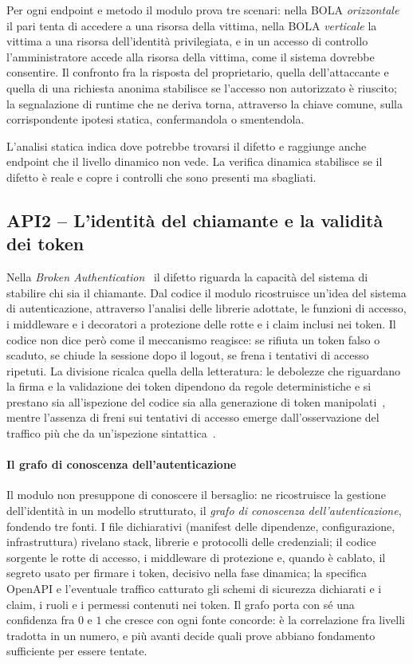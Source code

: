 Per ogni endpoint e metodo il modulo prova tre scenari: nella BOLA
\emph{orizzontale} il pari tenta di accedere a una risorsa della vittima, nella
BOLA \emph{verticale} la vittima a una risorsa dell'identità privilegiata, e in
un accesso di controllo l'amministratore accede alla risorsa della vittima,
come il sistema dovrebbe consentire. Il confronto fra la risposta del
proprietario, quella dell'attaccante e quella di una richiesta anonima
stabilisce se l'accesso non autorizzato è riuscito; la segnalazione di runtime
che ne deriva torna, attraverso la chiave comune, sulla corrispondente ipotesi
statica, confermandola o smentendola.

L'analisi statica indica dove potrebbe trovarsi il difetto e raggiunge anche
endpoint che il livello dinamico non vede. La verifica dinamica stabilisce se
il difetto è reale e copre i controlli che sono presenti ma sbagliati.

\subsection{API2 -- L'identità del chiamante e la validità dei token}
\label{sec:rilevamento-broken-auth}

Nella \emph{Broken Authentication}~\cite{owasp2023api2} il difetto riguarda la
capacità del sistema di stabilire chi sia il chiamante. Dal codice il modulo ricostruisce un'idea
del sistema di autenticazione, attraverso l'analisi delle librerie adottate, le funzioni di accesso,
i middleware e i decoratori a protezione delle rotte e i claim inclusi nei token. Il codice non dice
però come il meccanismo reagisce: se rifiuta un token falso o scaduto, se chiude
la sessione dopo il logout, se frena i tentativi di accesso ripetuti. La
divisione ricalca quella della letteratura: le debolezze che riguardano la firma
e la validazione dei token dipendono da regole deterministiche e si prestano sia
all'ispezione del codice sia alla generazione di token
manipolati~\cite{yang2025jwteemo,xu2023jwtkey}, mentre l'assenza di freni sui
tentativi di accesso emerge dall'osservazione del traffico più che da
un'ispezione sintattica~\cite{owasp2026credential}.

\paragraph{Il grafo di conoscenza dell'autenticazione}
Il modulo non presuppone di conoscere il bersaglio: ne ricostruisce la gestione
dell'identità in un modello strutturato, il \emph{grafo di conoscenza
dell'autenticazione}, fondendo tre fonti. I file dichiarativi (manifest delle
dipendenze, configurazione, infrastruttura) rivelano stack, librerie e
protocolli delle credenziali; il codice sorgente le rotte di accesso, i
middleware di protezione e, quando è cablato, il segreto usato per firmare i
token, decisivo nella fase dinamica; la specifica OpenAPI e l'eventuale
traffico catturato gli schemi di sicurezza dichiarati e i claim, i ruoli e i
permessi contenuti nei token. Il grafo porta con sé una confidenza fra $0$ e
$1$ che cresce con ogni fonte concorde: è la correlazione fra livelli
tradotta in un numero, e più avanti decide quali prove abbiano
fondamento sufficiente per essere tentate.

